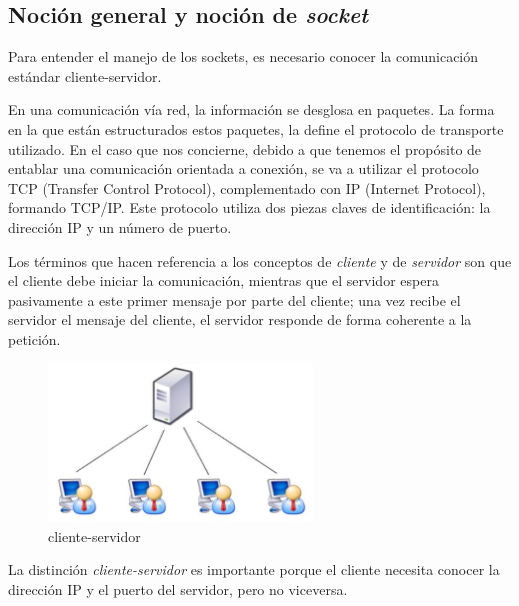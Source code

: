 \documentclass[a4paper,11pt]{book}
\begin{document}
			\subsection{Noción general y noción de \textit{socket}}
				Para entender el manejo de los sockets, es necesario conocer la comunicación estándar cliente-servidor.
				
				En una comunicación vía red, la información se desglosa en paquetes. La forma en la que están estructurados estos paquetes, la define el protocolo de transporte utilizado. En el caso que nos concierne, debido a que tenemos el propósito de entablar una comunicación orientada a conexión, se va a utilizar el protocolo TCP (Transfer Control Protocol), complementado con IP (Internet Protocol), formando TCP/IP. Este protocolo utiliza dos piezas claves de identificación: la dirección IP y un número de puerto.
				
				Los términos que hacen referencia a los conceptos de \textit{cliente} y de \textit{servidor} son que el cliente debe iniciar la comunicación, mientras que el servidor espera pasivamente a este primer mensaje por parte del cliente; una vez recibe el servidor el mensaje del cliente, el servidor responde de forma coherente a la petición.

				\begin{figure}[hbtp]
				\centering
				\includegraphics[width = 7cm]{FIGURAS/cliente-servidor.JPG}
				\caption{cliente-servidor}
				\end{figure}
				
				 La distinción \textit{cliente-servidor} es importante porque el cliente necesita conocer la dirección IP y el puerto del servidor, pero no viceversa.
				 
\end{document}

